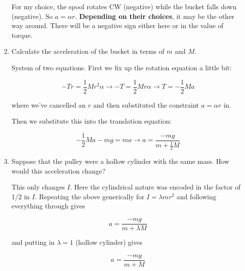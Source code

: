 \documentclass[12pt]{article}
\begin{document}
\begin{enumerate}
{\color{red}

For my choice, the spool rotates CW (negative) while the bucket falls down (negative). So $a = \alpha r$. {\bf Depending on their choices}, it may be the other way around. There will be a negative sign either here or in the value of torque.

}

\vspace{1in}

\item Calculate the acceleration of the bucket in terms of $m$ and $M$.


{\color{red}

System of two equations. First we fix up the rotation equation a little bit:

$$-Tr = \frac{1}{2}Mr^2 \alpha \rightarrow -T = \frac{1}{2}Mr\alpha \rightarrow T = -\frac{1}{2}Ma$$

where we've cancelled an $r$ and then substituted the constraint $a = \alpha r$ in.

Then we substitute this into the translation equation:

$$-\frac{1}{2}Ma - mg = ma  \rightarrow a = \frac{-mg}{m+\frac{1}{2}M}$$





}



\item Suppose that the pulley were a hollow cylinder with the same mass. How would this acceleration change?

 
 {\color{red}
This only changes $I$. Here the cylindrical nature was encoded in the factor of 1/2 in $I$. Repeating the above generically for $I=\lambda mr^2$ and following everything through gives


 $$a = \frac{-mg}{m+\lambda M}$$
 
 and putting in $\lambda=1$ (hollow cylinder) gives
 
 $$a = \frac{-mg}{m+M}$$
}
 


\end{enumerate}
\end{document}
